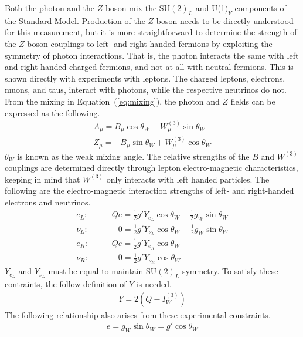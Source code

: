 Both the photon and the $Z$ boson mix the SU$(2)_L$ and U(1$)_Y$ components of the Standard Model.
Production of the $Z$ boson needs to be directly understood for this measurement,
but it is more straightforward to determine the strength of the $Z$ boson couplings to left-
and right-handed fermions by exploiting the symmetry of photon interactions.
That is, the photon interacts the same with left and right handed charged fermions,
and not at all with neutral fermions.
This is shown directly with experiments with leptons.
The charged leptons, electrons, muons, and taus, interact with photons,
while the respective neutrinos do not.
From the mixing in Equation~(\ref{eq:mixing}),
the photon and $Z$ fields can be expressed as the following.
\begin{gather}
  A_\mu = B_\mu \cos \theta_W + W_\mu^{(3)} \sin \theta_W \\
  Z_\mu = - B_\mu \sin \theta_W + W_\mu^{(3)} \cos \theta_W \label{eq:z-force}
\end{gather}
$\theta_W$ is known as the weak mixing angle.
The relative strengths of the $B$ and $W^{(3)}$ couplings
are determined directly through lepton electro-magnetic characteristics,
keeping in mind that $W^{(3)}$ only interacts with left handed particles.
The following are the electro-magnetic interaction strengths of left- and right-handed electrons and neutrinos.
\begin{align}
  e_L:& \qquad Qe = \frac12 g' Y_{e_L} \cos \theta_W - \frac12 g_W \sin \theta_W \\
  \nu_L:& \qquad \phantom{Q}0 = \frac12 g' Y_{\nu_L} \cos \theta_W - \frac12 g_W \sin \theta_W \\
  e_R:& \qquad Qe = \frac12 g' Y_{e_R} \cos \theta_W \\
  \nu_R:& \qquad \phantom{Q}0 = \frac12 g' Y_{\nu_R} \cos \theta_W
\end{align}
$Y_{e_L}$ and $Y_{\nu_L}$ must be equal to maintain SU$(2)_L$ symmetry.
To satisfy these contraints, the follow definition of $Y$ is needed.
\begin{gather}
  Y = 2\left(Q - I_W^{(3)}\right)
\end{gather}
The following relationship also arises from these experimental constraints.
\begin{gather}
  e = g_W \sin \theta_W = g' \cos \theta_W
\end{gather}


